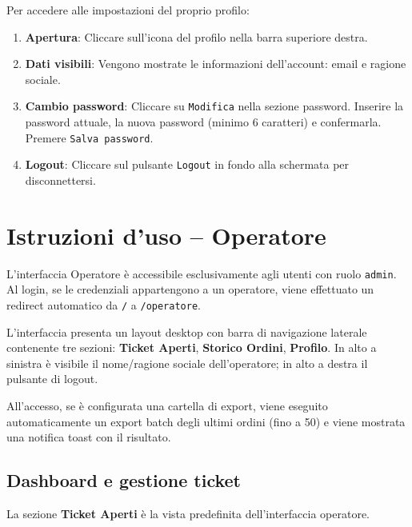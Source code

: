 \documentclass[a4paper, 11pt, oneside]{scrartcl}
\begin{document}
Per accedere alle impostazioni del proprio profilo:

\begin{enumerate}
    \item \textbf{Apertura}: Cliccare sull'icona del profilo nella barra superiore destra.
    \item \textbf{Dati visibili}: Vengono mostrate le informazioni dell'account: email e ragione sociale.
    \item \textbf{Cambio password}: Cliccare su \texttt{Modifica} nella sezione password. Inserire la password attuale, la nuova password (minimo 6 caratteri) e confermarla. Premere \texttt{Salva password}.
    \item \textbf{Logout}: Cliccare sul pulsante \texttt{Logout} in fondo alla schermata per disconnettersi.
\end{enumerate}

\newpage
\section{Istruzioni d'uso -- Operatore}

L'interfaccia Operatore \`e accessibile esclusivamente agli utenti con ruolo \texttt{admin}. Al login, se le credenziali appartengono a un operatore, viene effettuato un redirect automatico da \texttt{/} a \texttt{/operatore}.

L'interfaccia presenta un layout desktop con barra di navigazione laterale contenente tre sezioni: \textbf{Ticket Aperti}, \textbf{Storico Ordini}, \textbf{Profilo}. In alto a sinistra \`e visibile il nome/ragione sociale dell'operatore; in alto a destra il pulsante di logout.

All'accesso, se \`e configurata una cartella di export, viene eseguito automaticamente un export batch degli ultimi ordini (fino a 50) e viene mostrata una notifica toast con il risultato.

\subsection{Dashboard e gestione ticket}

La sezione \textbf{Ticket Aperti} \`e la vista predefinita dell'interfaccia operatore.
\end{document}
